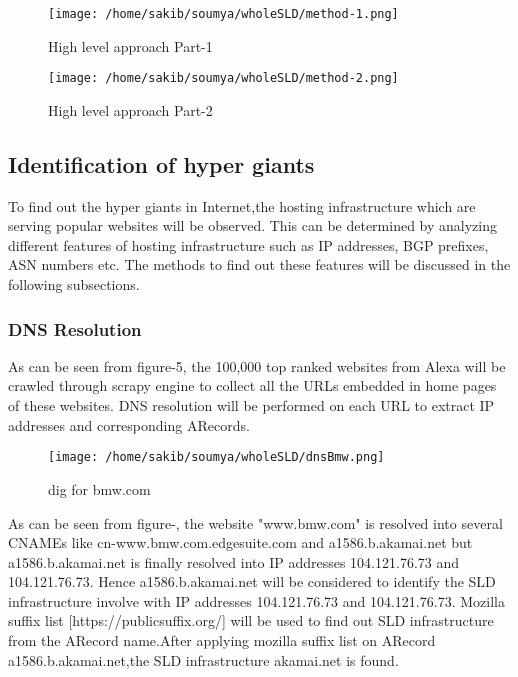 \begin{figure}[h]
\texttt{[image: /home/sakib/soumya/wholeSLD/method-1.png]}
\centering
\caption{High level approach Part-1}
\end{figure}

\begin{figure}[h]
\texttt{[image: /home/sakib/soumya/wholeSLD/method-2.png]}
\centering
\caption{High level approach Part-2}
\end{figure}

\subsection{Identification of hyper giants}
To find out the hyper giants in Internet,the hosting infrastructure which are serving popular websites will be observed. This can be determined by analyzing different features of hosting infrastructure such as IP addresses, BGP prefixes, ASN numbers etc. The methods to find out these features will be discussed in the following subsections.
\subsubsection{DNS Resolution}
As can be seen from figure-5, the 100,000  top ranked websites from Alexa will be crawled through scrapy engine to collect all the URLs embedded in home pages of these websites. DNS resolution will be performed on each URL to extract IP addresses and corresponding ARecords.
\begin{figure}[h]
\texttt{[image: /home/sakib/soumya/wholeSLD/dnsBmw.png]}
\centering
\caption{dig for bmw.com}
\end{figure}
As can be seen from figure-, the website "www.bmw.com" is resolved into several CNAMEs like cn-www.bmw.com.edgesuite.com and a1586.b.akamai.net but a1586.b.akamai.net is  finally resolved into IP addresses 104.121.76.73 and 104.121.76.73. Hence a1586.b.akamai.net will be considered  to identify the SLD infrastructure involve with IP addresses 104.121.76.73 and 104.121.76.73. Mozilla suffix list [https://publicsuffix.org/] will be used to find out SLD infrastructure from the ARecord name.After applying mozilla suffix list on ARecord a1586.b.akamai.net,the SLD infrastructure akamai.net is found. 

